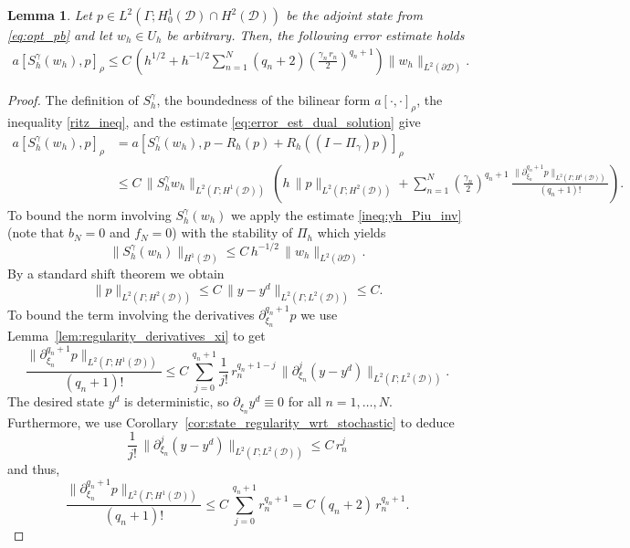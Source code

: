 \documentclass[a4paper,10pt]{article}
\newcommand{\cD}{{\mathcal{D}}}
\newtheorem{lemma}[theorem]{Lemma}
\numberwithin{theorem}{section}
\begin{document}
\begin{lemma}
\label{lem:estimate_normal_derivatives}
Let $p\in L^2(\Gamma; H^1_0(\cD) \cap H^2(\cD))$ be the adjoint state from \eqref{eq:opt_pb} and let $w_h\in U_h$ be arbitrary. Then, the following error estimate holds
\begin{align*}
	a[S_h^\gamma (w_h), p]_\rho
	\le C\,\left(h^{1/2} +  h^{-1/2}\sum \limits_{n=1}^N (q_n+2)\left(\frac{\gamma_n\,r_n}{2}\right)^{q_n+1}\right)\|w_h\|_{L^2(\partial\cD)}.
\end{align*}
\end{lemma}
\begin{proof}
  The definition of $S_h^\gamma$, the boundedness of the bilinear form $a[\cdot, \cdot]_{\rho}$, the inequality \eqref{ritz_ineq}, and the estimate \eqref{eq:error_est_dual_solution} give
\begin{align}\label{eq:adjoint_error_proof_1}
a[S_h^\gamma (w_h), p]_\rho  & = a[S_h^\gamma (w_h), p - R_h(p)  + R_h((I - \Pi_{\gamma})p)]_\rho\nonumber \\
&\le C\,\|S_h^\gamma w_h\|_{L^2(\Gamma; H^1(\cD))}\,
\left(h\,\|p\|_{L^2(\Gamma; H^2(\cD))} + \sum_{n=1}^N \left(\frac{\gamma_n}{2}\right)^{q_n+1}\,\frac{\|\partial_{\xi_n}^{q_n+1}p\|_{L^2(\Gamma;H^1(\cD))}}{(q_n+1)!} \right).
\end{align}
To bound the norm involving $S_h^\gamma (w_h)$ we apply the estimate \eqref{ineq:yh_Piu_inv} (note that $b_N=0$ and $f_N=0$) with the stability of $\Pi_h$ which yields
\begin{equation}
  \label{eq:bound_Shgamma_by_discrete_bd_data}
  \|S_h^\gamma (w_h)\|_{H^1(\cD)} \le C\,h^{-1/2}\,\|w_h\|_{L^2(\partial\cD)}.
\end{equation}
By a standard shift theorem we obtain
\begin{equation}
  \label{eq:shift_theorem_adjoint_state}
  \|p\|_{L^2(\Gamma;H^2(\cD))}\le C\,\|y-y^d\|_{L^2(\Gamma; L^2(\cD))}\le C.
\end{equation}
To bound the term involving the derivatives $\partial_{\xi_n}^{q_n+1} p$ we use Lemma~\ref{lem:regularity_derivatives_xi} to get
\begin{equation*}
  \frac{\|\partial_{\xi_n}^{q_n+1}p\|_{L^2(\Gamma;H^1(\cD))}}{(q_n+1)!}
  \le
  C\,\sum_{j=0}^{q_n+1} \frac1{j!}\,r_n^{q_n+1-j}\,\|\partial_{\xi_n}^j(y-y^d)\|_{L^2(\Gamma; L^2(\cD))}.
\end{equation*}
The desired state $y^d$ is deterministic, so $\partial_{\xi_n} y^d \equiv 0$ for all $n=1,\ldots,N$. Furthermore, we use Corollary~\ref{cor:state_regularity_wrt_stochastic} to deduce
\begin{equation*}
  \frac1{j!}\,\|\partial_{\xi_n}^j(y-y^d)\|_{L^2(\Gamma; L^2(\cD))}
  \le C\,r_n^{j}
\end{equation*}
and thus,
\begin{equation}\label{eq:adjoint_state_stochastic_derivaties}
  \frac{\|\partial_{\xi_n}^{q_n+1}p\|_{L^2(\Gamma;H^1(\cD))}}{(q_n+1)!}
  \le C\,\sum_{j=0}^{q_n+1} r_n^{q_n+1} = C\,(q_n+2)\,r_n^{q_n+1}.
\end{equation}


\end{proof}
\end{document}
